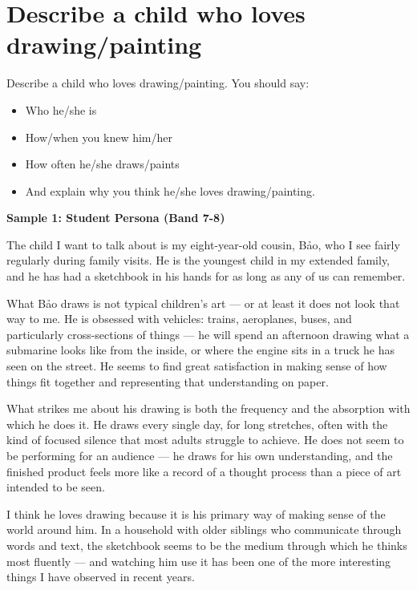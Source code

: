 \section{Describe a child who loves drawing/painting}
\begin{ieltsprompt}
Describe a child who loves drawing/painting.
You should say:
\begin{itemize}[leftmargin=2em, itemsep=2pt]
\item Who he/she is
\item How/when you knew him/her
\item How often he/she draws/paints
\item And explain why you think he/she loves drawing/painting.
\end{itemize}
\end{ieltsprompt}
\begin{ieltsanswer}
\textbf{Sample 1: Student Persona (Band 7-8)}

The child I want to talk about is my eight-year-old cousin, Bảo, who I see fairly regularly during family visits. He is the youngest child in my extended family, and he has had a sketchbook in his hands for as long as any of us can remember.

What Bảo draws is not typical children's art — or at least it does not look that way to me. He is obsessed with vehicles: trains, aeroplanes, buses, and particularly cross-sections of things — he will spend an afternoon drawing what a submarine looks like from the inside, or where the engine sits in a truck he has seen on the street. He seems to find great satisfaction in making sense of how things fit together and representing that understanding on paper.

What strikes me about his drawing is both the frequency and the absorption with which he does it. He draws every single day, for long stretches, often with the kind of focused silence that most adults struggle to achieve. He does not seem to be performing for an audience — he draws for his own understanding, and the finished product feels more like a record of a thought process than a piece of art intended to be seen.

I think he loves drawing because it is his primary way of making sense of the world around him. In a household with older siblings who communicate through words and text, the sketchbook seems to be the medium through which he thinks most fluently — and watching him use it has been one of the more interesting things I have observed in recent years.


\end{ieltsanswer}
